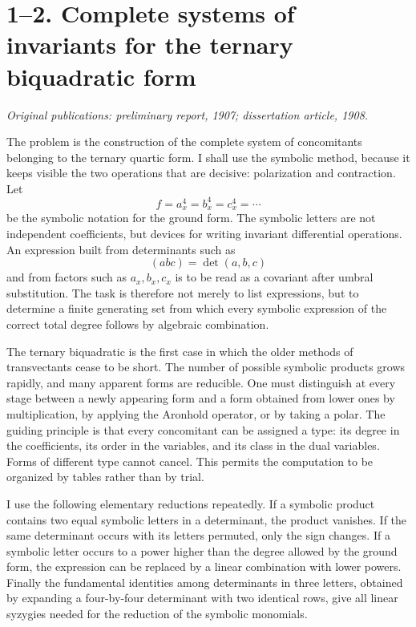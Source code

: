\documentclass[12pt]{article}
\begin{document}
\section{1--2. Complete systems of invariants for the ternary biquadratic form}

\textit{Original publications: preliminary report, 1907; dissertation article, 1908.}

The problem is the construction of the complete system of concomitants belonging to the ternary
quartic form. I shall use the symbolic method, because it keeps visible the two operations that are
decisive: polarization and contraction. Let \[   f=a_x^4=b_x^4=c_x^4=\cdots \] be the symbolic
notation for the ground form. The symbolic letters are not independent coefficients, but devices for
writing invariant differential operations. An expression built from determinants such as \[
(abc)=\det(a,b,c) \] and from factors such as \(a_x,b_x,c_x\) is to be read as a covariant after
umbral substitution. The task is therefore not merely to list expressions, but to determine a finite
generating set from which every symbolic expression of the correct total degree follows by algebraic
combination.


The ternary biquadratic is the first case in which the older methods of transvectants cease to be
short. The number of possible symbolic products grows rapidly, and many apparent forms are
reducible. One must distinguish at every stage between a newly appearing form and a form obtained
from lower ones by multiplication, by applying the Aronhold operator, or by taking a polar. The
guiding principle is that every concomitant can be assigned a type: its degree in the coefficients,
its order in the variables, and its class in the dual variables. Forms of different type cannot
cancel. This permits the computation to be organized by tables rather than by trial.


I use the following elementary reductions repeatedly. If a symbolic product contains two equal
symbolic letters in a determinant, the product vanishes. If the same determinant occurs with its
letters permuted, only the sign changes. If a symbolic letter occurs to a power higher than the
degree allowed by the ground form, the expression can be replaced by a linear combination with lower
powers. Finally the fundamental identities among determinants in three letters, obtained by
expanding a four-by-four determinant with two identical rows, give all linear syzygies needed for
the reduction of the symbolic monomials.
\end{document}
